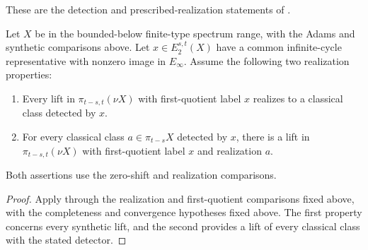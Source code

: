 \begin{theorem}
\label{sem:Literature:complete-detection}
These are the detection and prescribed-realization statements of \cite[Theorem A.1(2b),(3b)]{BHS}.\par

Let $X$ be in the bounded-below finite-type spectrum range, with the
Adams and synthetic comparisons above. Let $x\in E_2^{s,t}(X)$ have
a common infinite-cycle representative with nonzero image in
$E_\infty$. Assume the following two realization properties:
\begin{enumerate}
\item Every lift in $\pi_{t-s,t}(\nu X)$ with first-quotient label
$x$ realizes to a classical class detected by $x$.
\item For every classical class $a\in\pi_{t-s}X$ detected by $x$,
there is a lift in $\pi_{t-s,t}(\nu X)$ with first-quotient label $x$
and realization $a$.
\end{enumerate}
Both assertions use the zero-shift and realization comparisons.


\end{theorem}
\begin{proof}
Apply \cite[Theorem A.1(2b),(3b)]{BHS} through the realization and
first-quotient comparisons fixed above, with the completeness and
convergence hypotheses fixed above. The first property concerns every
synthetic lift, and the second provides a lift of every classical class
with the stated detector.
\end{proof}

